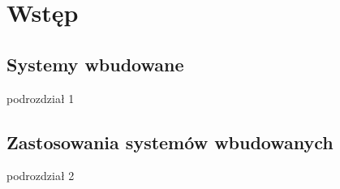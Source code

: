 \documentclass[document.tex]{subfiles}
\begin{document}
\chapter{Wstęp}

\section{Systemy wbudowane}
podrozdział 1
\section{Zastosowania systemów wbudowanych}
podrozdział 2
\end{document}
